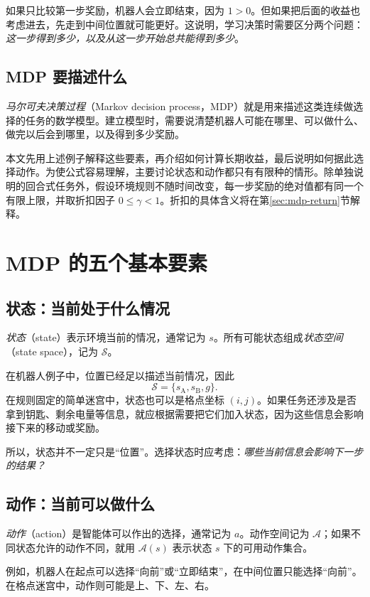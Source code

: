 \documentclass[UTF8,12pt,a4paper,fontset=fandol]{ctexart}
\begin{document}
如果只比较第一步奖励，机器人会立即结束，因为 $1>0$。但如果把后面的收益也考虑进去，先走到中间位置就可能更好。这说明，学习决策时需要区分两个问题：\emph{这一步得到多少，以及从这一步开始总共能得到多少}。

\subsection{MDP 要描述什么}

\emph{马尔可夫决策过程}（Markov decision process，MDP）就是用来描述这类连续做选择的任务的数学模型。建立模型时，需要说清楚机器人可能在哪里、可以做什么、做完以后会到哪里，以及得到多少奖励。

本文先用上述例子解释这些要素，再介绍如何计算长期收益，最后说明如何据此选择动作。为使公式容易理解，主要讨论状态和动作都只有有限种的情形。除单独说明的回合式任务外，假设环境规则不随时间改变，每一步奖励的绝对值都有同一个有限上限，并取折扣因子 $0\leq\gamma<1$。折扣的具体含义将在第\ref{sec:mdp-return}节解释。

\section{MDP 的五个基本要素}
\label{sec:mdp-elements}

\subsection{状态：当前处于什么情况}

\emph{状态}（state）表示环境当前的情况，通常记为 $s$。所有可能状态组成\emph{状态空间}（state space），记为 $\mathcal S$。

在机器人例子中，位置已经足以描述当前情况，因此
\[
  \mathcal S=\{s_{\mathrm A},s_{\mathrm B},g\}.
\]
在规则固定的简单迷宫中，状态也可以是格点坐标 $(i,j)$。如果任务还涉及是否拿到钥匙、剩余电量等信息，就应根据需要把它们加入状态，因为这些信息会影响接下来的移动或奖励。

所以，状态并不一定只是“位置”。选择状态时应考虑：\emph{哪些当前信息会影响下一步的结果？}

\subsection{动作：当前可以做什么}

\emph{动作}（action）是智能体可以作出的选择，通常记为 $a$。动作空间记为 $\mathcal A$；如果不同状态允许的动作不同，就用 $\mathcal A(s)$ 表示状态 $s$ 下的可用动作集合。

例如，机器人在起点可以选择“向前”或“立即结束”，在中间位置只能选择“向前”。在格点迷宫中，动作则可能是上、下、左、右。
\end{document}
